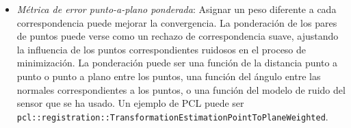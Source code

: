 \begin{itemize}
    \item \textit{Métrica de error punto-a-plano ponderada}: Asignar un peso diferente a cada correspondencia puede mejorar la convergencia. La ponderación de los pares de puntos puede verse como un rechazo de correspondencia suave, ajustando la influencia de los puntos correspondientes ruidosos en el proceso de minimización. La ponderación puede ser una función de la distancia punto a punto o punto a plano entre los puntos, una función del ángulo entre las normales correspondientes a los puntos, o una función del modelo de ruido del sensor que se ha usado. Un ejemplo de PCL puede ser \lstinline{pcl::registration::TransformationEstimationPointToPlaneWeighted}.
\end{itemize}


